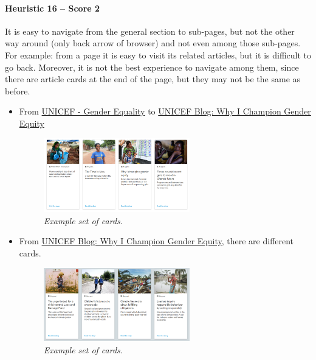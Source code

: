 \paragraph*{Heuristic 16 – Score 2}
It is easy to navigate from the general section to sub-pages, but not the other way around (only back arrow of browser) and not even among those sub-pages. For example: from a page it is easy to visit its related articles, but it is difficult to go back. Moreover, it is not the best experience to navigate among them, since there are article cards at the end of the page, but they may not be the same as before.
\begin{itemize}
	\item From \href{https://www.unicef.org/gender-equality}{UNICEF - Gender Equality} to \href{https://www.unicef.org/blog/why-i-champion-gender-equity}{UNICEF Blog: Why I Champion Gender Equity}
	\begin{figure}[h]
		\centering
		\begin{center}
			\includegraphics[width=0.6\textwidth]{Picture19.png}
		\end{center}
		\captionsetup{font=small}
		\caption{\textit{Example set of cards.}}
		\label{fig:label19}
	\end{figure}
	\item From \href{https://www.unicef.org/blog/why-i-champion-gender-equity}{UNICEF Blog: Why I Champion Gender Equity}, there are different cards.
	\begin{figure}[h]
		\centering
		\begin{center}
			\includegraphics[width=0.6\textwidth]{Picture20.png}
		\end{center}
		\captionsetup{font=small}
		\caption{\textit{Example set of cards.}}
		\label{fig:label20}
	\end{figure}
	
\end{itemize}

